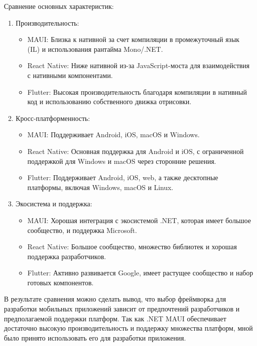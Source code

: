 Сравнение основных характеристик:
\begin{enumerate} 
    \item Производительность:
    \begin{itemize}
        \item MAUI: Близка к нативной за счет компиляции в промежуточный язык (IL) и использования рантайма Mono/.NET.
        \item React Native: Ниже нативной из-за JavaScript-моста для взаимодействия с нативными компонентами.
        \item Flutter: Высокая производительность благодаря компиляции в нативный код и использованию собственного движка отрисовки.
    \end{itemize}
    
    \item Кросс-платформенность:
    \begin{itemize}
        \item MAUI: Поддерживает Android, iOS, macOS и Windows.
        \item React Native: Основная поддержка для Android и iOS, с ограниченной поддержкой для Windows и macOS через сторонние решения.
        \item Flutter: Поддерживает Android, iOS, web, а также десктопные платформы, включая Windows, macOS и Linux.
    \end{itemize}

    \item Экосистема и поддержка:
    \begin{itemize}
        \item MAUI: Хорошая интеграция с экосистемой .NET, которая имеет большое сообщество, и поддержка Microsoft.
        \item React Native: Большое сообщество, множество библиотек и хорошая поддержка разработчиков.
        \item Flutter: Активно развивается Google, имеет растущее сообщество и набор готовых компонентов.
    \end{itemize}
\end{enumerate}

В результате сравнения можно сделать вывод, что выбор фреймворка для разработки мобильных приложений зависит от предпочтений разработчиков и предполагаемой поддержки платформ. Так как .NET MAUI обеспечивает достаточно высокую производительность и поддержку множества платформ, мной было принято использовать его для разработки приложения.